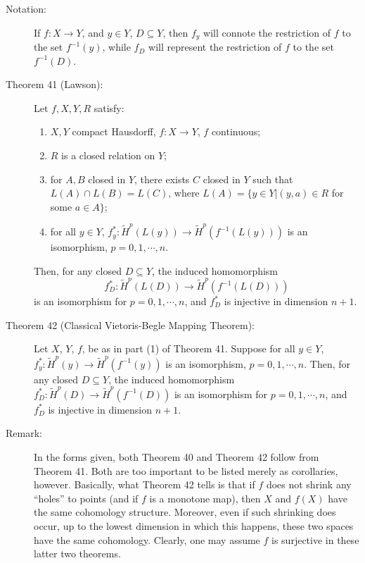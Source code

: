 \documentclass{article}
\begin{document}
\begin{description}

\item[Notation:] If $f: X \rightarrow Y$, and $y \in Y$, $D \subseteq Y$, then $f_y$ will connote the restriction of $f$ to the set $f^{-1}(y)$, while $f_D$ will represent the restriction of $f$ to the set $f^{-1}(D)$.

\item[Theorem 41 (Lawson):] Let $f,X,Y,R$ satisfy:
  \begin{enumerate}[\hspace{1cm}(1)]
    \item $X,Y$ compact Hausdorff, $f: X \rightarrow Y$, $f$ continuous;
    \item $R$ is a closed relation on $Y$;
    \item for $A,B$ closed in $Y$, there exists $C$ closed in $Y$ such that $L(A) \cap L(B) = L(C)$, where $L(A) = \{ y \in Y \vert (y,a) \in R$ for some $a \in A \}$; 
    \item for all $y \in Y$, $f_y^*: \widetilde{H}^p(L(y)) \rightarrow \widetilde{H}^p( f^{-1}(L(y)) )$ is an isomorphism, $p=0,1,\cdots,n$.
  \end{enumerate}
  Then, for any closed $D \subseteq Y$, the induced homomorphism
  \begin{equation*}
  f_D^*: \widetilde{H}^p(L(D)) \rightarrow \widetilde{H}^p(f^{-1}(L(D)))
  \end{equation*}
  is an isomorphism for $p=0,1,\cdots,n$, and $f_D^*$ is injective in dimension $n+1$.

\item[Theorem 42 (Classical Vietoris-Begle Mapping Theorem):] Let $X$, $Y$, $f$, be as in part (1) of Theorem 41. Suppose for all $y \in Y$, $f_y^*: \widetilde{H}^p(y) \rightarrow \widetilde{H}^p(f^{-1}(y))$ is an isomorphism, $p=0,1,\cdots,n$. Then, for any closed $D \subseteq Y$, the induced homomorphism $f_D^*: \widetilde{H}^p(D) \rightarrow \widetilde{H}^p(f^{-1}(D))$ is an isomorphism for $p=0,1,\cdots,n$, and $f_D^*$ is injective in dimension $n+1$.

\item[Remark:] In the forms given, both Theorem 40 and Theorem 42 follow from Theorem 41. Both are too important to be listed merely as corollaries, however. Basically, what Theorem 42 tells is that if $f$ does not shrink any ``holes'' to points (and if $f$ is a monotone map), then $X$ and $f(X)$ have the same cohomology structure. Moreover, even if such shrinking does occur, up to the lowest dimension in which this happens, these two spaces have the same cohomology. Clearly, one may assume $f$ is surjective in these latter two theorems.

\end{description}
\end{document}
